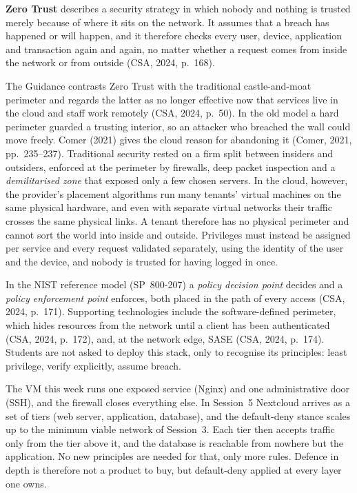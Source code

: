 \begin{definition}\label{def:zerotrust}
\textbf{Zero Trust} describes a security strategy in which nobody and nothing
is trusted merely because of where it sits on the network. It assumes that a
breach has happened or will happen, and it therefore checks every user, device,
application and transaction again and again, no matter whether a request
comes from inside the network or from outside (CSA, 2024, p.~168).
\end{definition}

The Guidance contrasts Zero Trust with the traditional castle-and-moat
perimeter and regards the latter as no longer effective now that services
live in the cloud and staff work remotely (CSA, 2024, p.~50). In the old
model a hard perimeter guarded a trusting interior, so an attacker who
breached the wall could move freely. Comer (2021) gives the cloud reason for
abandoning it (Comer, 2021, pp.~235--237). Traditional security rested on a
firm split between insiders and outsiders, enforced at the perimeter by
firewalls, deep packet inspection and a \emph{demilitarised zone} that
exposed only a few chosen servers. In the cloud, however, the provider's
placement algorithms run many tenants' virtual machines on the same physical
hardware, and even with separate virtual networks their traffic crosses the
same physical links. A tenant therefore has no physical perimeter and cannot
sort the world into inside and outside. Privileges must instead be assigned
per service and every request validated separately, using the identity of
the user and the device, and nobody is trusted for having logged in once.

In the NIST reference model (SP~800-207) a \emph{policy decision point}
decides and a \emph{policy enforcement point} enforces, both placed in the
path of every access (CSA, 2024, p.~171). Supporting technologies include
the software-defined perimeter, which hides resources from the network until
a client has been authenticated (CSA, 2024, p.~172), and, at the network
edge, SASE (CSA, 2024, p.~174). Students are not asked to deploy this stack,
only to recognise its principles: least privilege, verify explicitly, assume
breach.

\begin{example}\label{ex:mvn-preview}
The VM this week runs one exposed service (Nginx) and one administrative door
(SSH), and the firewall closes everything else. In Session~5 Nextcloud arrives
as a set of tiers (web server, application, database), and the default-deny
stance scales up to the minimum viable network of Session~3. Each tier then
accepts traffic only from the tier above it, and the database is reachable
from nowhere but the application. No new principles are needed for that, only more
rules. Defence in depth is therefore not a product to buy, but default-deny
applied at every layer one owns.
\end{example}

